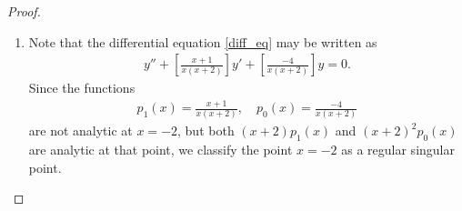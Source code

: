 \documentclass[12pt]{article}
\theoremstyle{definition}
\begin{document}
\begin{proof}
  \begin{enumerate}
    \item Note that the differential equation \eqref{diff_eq} may be written as
      \begin{align*}
        y'' + \left[\frac{x+1}{x(x+2)}\right] y' + \left[\frac{-4}{x(x+2)}\right]y = 0.
      \end{align*}
      Since the functions
      \begin{align*}
        p_1(x) = \frac{x+1}{x(x+2)}, \quad p_0(x) = \frac{-4}{x(x+2)}
      \end{align*}
      are not analytic at $x=-2$, but both $(x+2)p_1(x)$ and $(x+2)^2p_0(x)$ are
      analytic at that point, we classify the point $x=-2$ as a regular singular point.


\end{enumerate}
\end{proof}
\end{document}
